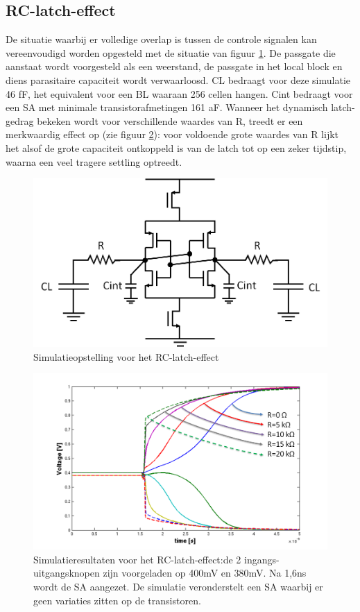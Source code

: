 \subsection{RC-latch-effect}
\label{RC-latch-effect}
De situatie waarbij er volledige overlap is tussen de controle signalen kan vereenvoudigd worden opgesteld met de situatie van figuur \ref{fig:RC-latch}. De passgate die aanstaat wordt voorgesteld als een weerstand, de passgate in het local block en diens parasitaire capaciteit wordt verwaarloosd. CL bedraagt voor deze simulatie 46 fF, het equivalent voor een BL waaraan 256 cellen hangen. Cint bedraagt voor een SA met minimale transistorafmetingen 161 aF. Wanneer het dynamisch latch-gedrag bekeken wordt voor verschillende waardes van R, treedt er een merkwaardig effect op (zie figuur \ref{fig:RC-latch-sim}): voor voldoende grote waardes van R lijkt het alsof de grote capaciteit ontkoppeld is van de latch tot op een zeker tijdstip, waarna een veel tragere settling optreedt.
\begin{figure}
  \centering
  \includegraphics[scale=0.4]{../fig/hfdstk-sensamp-RC-latch.png}
  \caption[Simulatieopstelling voor het RC-latch-effect]{Simulatieopstelling voor het RC-latch-effect}
  \label{fig:RC-latch}
\end{figure}
\begin{figure}
  \centering
  \includegraphics[scale=0.4]{../fig/hfdstk-sensamp-RC-latch-sim.png}
  \caption[Simulatieresultaten voor het RC-latch-effect]{Simulatieresultaten voor het RC-latch-effect:de 2 ingangs-uitgangsknopen zijn voorgeladen op 400mV en 380mV. Na 1,6ns wordt de SA aangezet. De simulatie veronderstelt een SA waarbij er geen variaties zitten op de transistoren.}
  \label{fig:RC-latch-sim}
\end{figure}
